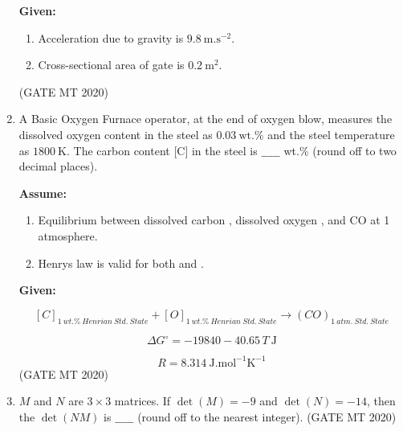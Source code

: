 \documentclass[journal, 11pt, onecolumn]{IEEEtran}
\theoremstyle{remark}
\begin{document}
\begin{enumerate}
\textbf{Given:}  
\begin{enumerate}
\item Acceleration due to gravity is $9.8 \ \text{m.s}^{-2}$.  
\item Cross-sectional area of gate is $0.2 \ \text{m}^2$.  
\end{enumerate}
\hfill(GATE MT 2020)


\item A Basic Oxygen Furnace operator, at the end of oxygen blow, measures the dissolved oxygen content in the steel as $0.03 \ \text{wt.\%}$ and the steel temperature as $1800 \ \text{K}$. The carbon content [C] in the steel is $\_\_\_\_\_$ wt.\% (round off to two decimal places).  

\textbf{Assume:}  
\begin{enumerate}
\item Equilibrium between dissolved carbon , dissolved oxygen , and CO  at 1 atmosphere.  
\item Henry\textquotesingle s law is valid for both  and .  
\end{enumerate}

\textbf{Given:}  

$$
[C]_{{1 \ wt.\% \ Henrian \ Std.\ State}} + [O]_{{1 \ wt.\% \ Henrian \ Std.\ State}} \rightarrow (CO)_{1 \ atm. \ Std.\ State}
$$

$$
\Delta G^\circ = -19840 - 40.65 \, T \ \text{J}
$$

$$
R = 8.314 \ \text{J.mol}^{-1} \text{K}^{-1}
$$
\hfill(GATE MT 2020)


\item $M$ and $N$ are $3 \times 3$ matrices. If $\det(M) = -9$ and $\det(N) = -14$, then the $\det(NM)$ is $\_\_\_\_\_$ (round off to the nearest integer).  
\hfill(GATE MT 2020)

\end{enumerate}
\end{document}
